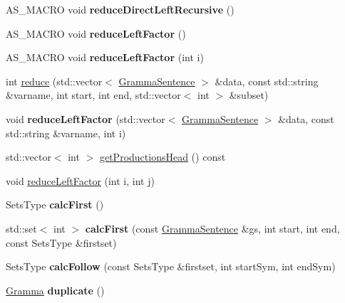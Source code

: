 \begin{DoxyCompactItemize}
A\+S\+\_\+\+M\+A\+C\+RO void {\bfseries reduce\+Direct\+Left\+Recursive} ()
\item 
\mbox{\label{classx2_1_1_gramma_a0f5c977a9bcb4b8547fb41e2085b8c70}} 
A\+S\+\_\+\+M\+A\+C\+RO void {\bfseries reduce\+Left\+Factor} ()
\item 
\mbox{\label{classx2_1_1_gramma_a326ea520b5348ec08e6e6f496220a080}} 
A\+S\+\_\+\+M\+A\+C\+RO void {\bfseries reduce\+Left\+Factor} (int i)
\item 
int \hyperlink{classx2_1_1_gramma_a883d11029de8fb73053b478870b78c89}{reduce} (std\+::vector$<$ \hyperlink{classx2_1_1_gramma_sentence}{Gramma\+Sentence} $>$ \&data, const std\+::string \&varname, int start, int end, std\+::vector$<$ int $>$ \&subset)
\item 
\mbox{\label{classx2_1_1_gramma_a242995260a76097e8a342b362106dff4}} 
void {\bfseries reduce\+Left\+Factor} (std\+::vector$<$ \hyperlink{classx2_1_1_gramma_sentence}{Gramma\+Sentence} $>$ \&data, const std\+::string \&varname, int i)
\item 
std\+::vector$<$ int $>$ \hyperlink{classx2_1_1_gramma_a17a55403158293775921697a94a7f2c1}{get\+Productions\+Head} () const
\item 
void \hyperlink{classx2_1_1_gramma_a15e7c86a1dae673945a108f1bf2fb80c}{reduce\+Left\+Factor} (int i, int j)
\item 
\mbox{\label{classx2_1_1_gramma_abc71debab97cec29b1a417c6801ca73a}} 
Sets\+Type {\bfseries calc\+First} ()
\item 
\mbox{\label{classx2_1_1_gramma_a4f587bc53e41f69627c7b30454813a20}} 
std\+::set$<$ int $>$ {\bfseries calc\+First} (const \hyperlink{classx2_1_1_gramma_sentence}{Gramma\+Sentence} \&gs, int start, int end, const Sets\+Type \&firstset)
\item 
\mbox{\label{classx2_1_1_gramma_a7936a7fb2f169fb995c55f0b114098a3}} 
Sets\+Type {\bfseries calc\+Follow} (const Sets\+Type \&firstset, int start\+Sym, int end\+Sym)
\item 
\mbox{\label{classx2_1_1_gramma_aa3a32e4425700a215bf112ccb8a2cf6b}} 
\hyperlink{classx2_1_1_gramma}{Gramma} {\bfseries duplicate} ()

\end{DoxyCompactItemize}
